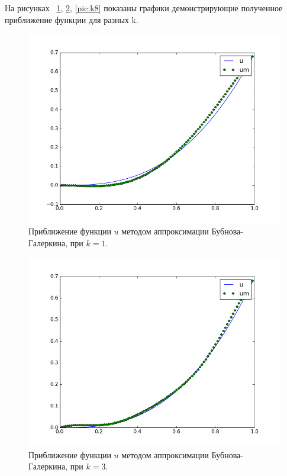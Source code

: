 \documentclass[12pt,a4paper,oneside]{extarticle}
\begin{document}
    На рисунках ~\ref{pic:k1}, \ref{pic:k3}, \ref{pic:k8} показаны графики демонстрирующие полученное приближение функции для разных k.
    \begin{figure}[ht!]
        \centering
        \includegraphics[scale=0.8]{k1.png}
        \caption{Приближение функции $u$ методом аппроксимации Бубнова-Галеркина, при $k = 1$.}
        \label{pic:k1}
    \end{figure}

    \begin{figure}[ht!]
        \centering
        \includegraphics[scale=0.8]{k3.png}
        \caption{Приближение функции $u$ методом аппроксимации Бубнова-Галеркина, при $k = 3$.}
        \label{pic:k3}
    \end{figure}
\end{document}
